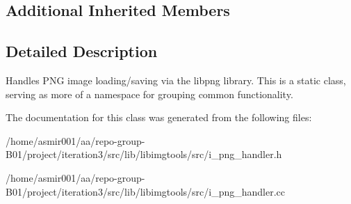 \subsection*{Additional Inherited Members}


\subsection{Detailed Description}
Handles P\+NG image loading/saving via the libpng library. This is a static class, serving as more of a namespace for grouping common functionality. 

The documentation for this class was generated from the following files\+:\begin{DoxyCompactItemize}
\item 
/home/asmir001/aa/repo-\/group-\/\+B01/project/iteration3/src/lib/libimgtools/src/i\+\_\+png\+\_\+handler.\+h\item 
/home/asmir001/aa/repo-\/group-\/\+B01/project/iteration3/src/lib/libimgtools/src/i\+\_\+png\+\_\+handler.\+cc\end{DoxyCompactItemize}
